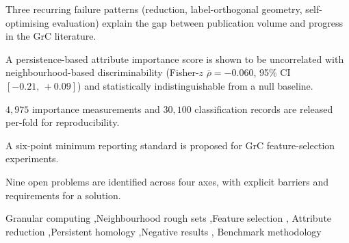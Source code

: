 \documentclass[a4paper,fleqn]{cas-sc}
\begin{document}
\begin{highlights}
\item Three recurring failure patterns (reduction, label-orthogonal geometry,
      self-optimising evaluation) explain the gap between publication volume
      and progress in the GrC literature.
\item A persistence-based attribute importance score is shown to be
      uncorrelated with neighbourhood-based discriminability
      (Fisher-$z$ $\bar\rho = -0.060$, 95\% CI $[-0.21,\,+0.09]$)
      and statistically indistinguishable from a null baseline.
\item $4{,}975$ importance measurements and $30{,}100$ classification records
      are released per-fold for reproducibility.
\item A six-point minimum reporting standard is proposed for GrC
      feature-selection experiments.
\item Nine open problems are identified across four axes,
      with explicit barriers and requirements for a solution.
\end{highlights}

\begin{keywords}
Granular computing \sep Neighbourhood rough sets \sep Feature selection \sep
Attribute reduction \sep Persistent homology \sep Negative results \sep
Benchmark methodology
\end{keywords}

\maketitle

\newtheorem{theorem}{Theorem}
\newtheorem{proposition}{Proposition}
\newtheorem{corollary}{Corollary}
\newtheorem{lemma}{Lemma}
\theoremstyle{definition}
\newtheorem{definition}{Definition}
\newtheorem{remark}{Remark}
\newtheorem{example}{Example}















\printcredits



\end{document}
